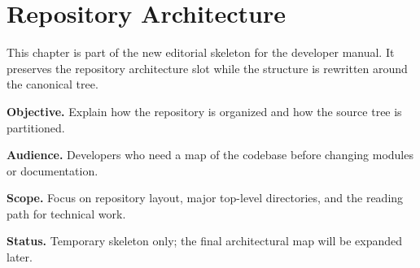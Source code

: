 \chapter{Repository Architecture}
\label{chap:repository-architecture}

This chapter is part of the new editorial skeleton for the developer manual. It preserves the repository architecture slot while the structure is rewritten around the canonical tree.

\noindent\textbf{Objective.} Explain how the repository is organized and how the source tree is partitioned.

\noindent\textbf{Audience.} Developers who need a map of the codebase before changing modules or documentation.

\noindent\textbf{Scope.} Focus on repository layout, major top-level directories, and the reading path for technical work.

\noindent\textbf{Status.} Temporary skeleton only; the final architectural map will be expanded later.
